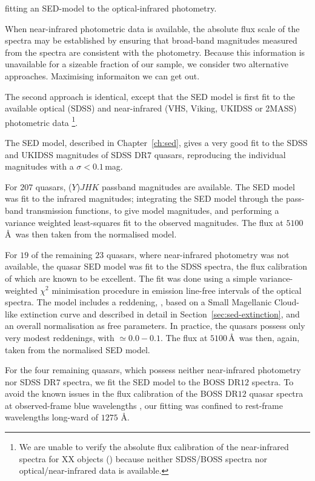 fitting an SED-model to the optical-infrared photometry. 




When near-infrared photometric data is available, the absolute flux scale of the spectra may be established by ensuring that broad-band magnitudes measured from the spectra are consistent with the photometry. 
Because this information is unavailable for a sizeable fraction of our sample, we consider two alternative approaches. 
Maximising informaiton we can get out. 


The second approach is identical, except that the SED model is first fit to the available optical (SDSS) and near-infrared (VHS, Viking, UKIDSS or 2MASS) photometric data \footnote{We are unable to verify the absolute flux calibration of the near-infrared spectra for XX objects () because neither SDSS/BOSS spectra nor optical/near-infrared data is available.}. 







The SED model, described in Chapter~\ref{ch:sed}, gives a very good fit to the SDSS and UKIDSS magnitudes of SDSS DR$7$ quasars, reproducing the individual magnitudes with a $\sigma <0.1$\,mag.



For $207$ quasars, ($Y$)$JHK$ passband magnitudes are available. 
The SED model was fit to the infrared magnitudes; integrating the SED model through the pass-band transmission functions, to give model magnitudes, and performing a variance weighted least-squares fit to the observed magnitudes. 
The flux at $5100$\,\AA\, was then taken from the normalised model.

For $19$ of the remaining $23$ quasars, where near-infrared photometry was not available, the quasar SED model was fit to the SDSS spectra, the flux calibration of which are known to be excellent.  
The fit was done using a simple variance-weighted $\chi^2$ minimisation procedure in emission line-free intervals of the optical spectra.   
The model includes a reddening, \ebv, based on a Small Magellanic Cloud-like extinction curve and described in detail in Section~\ref{sec:sed-extinction}, and an overall normalisation as free parameters.
In practice, the quasars possess only very modest reddenings, with \ebv$\simeq0.0-0.1$.
The flux at $5100$\,\AA\, was then, again, taken from the normalised SED model.

For the four remaining quasars, which possess neither near-infrared photometry nor SDSS DR$7$ spectra, we fit the SED model to the BOSS DR$12$ spectra. 
To avoid the known issues in the flux calibration of the BOSS DR$12$ quasar spectra at observed-frame blue wavelengths \citep{lee13}, our fitting was confined to rest-frame wavelengths long-ward of $1275$ \AA. 

